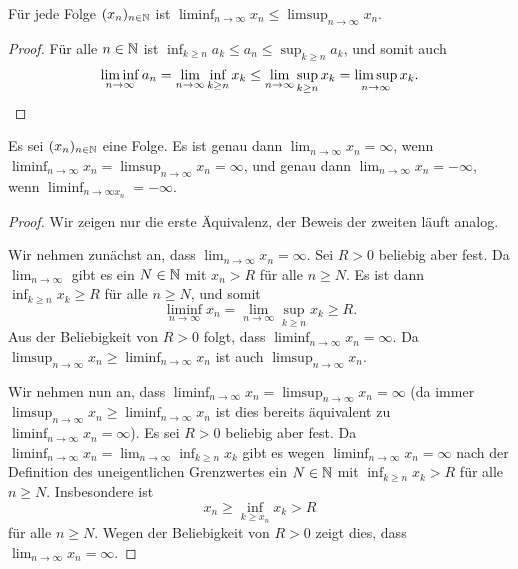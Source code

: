 \documentclass[a4paper,10pt]{article}
\begin{document}
\begin{lem}
 Für jede Folge $(x_n)_{n \in \mathbb{N}}$ ist $\liminf_{n \to \infty} x_n \leq \limsup_{n \to \infty} x_n$.
\end{lem}
\begin{proof}
 Für alle $n \in \mathbb{N}$ ist $\inf_{k \geq n} a_k \leq a_n \leq \sup_{k \geq n} a_k$, und somit auch
 \[
  \liminf_{n \to \infty} a_n
  = \lim_{n \to \infty} \inf_{k \geq n} x_k
  \leq \lim_{n \to \infty} \sup_{k \geq n} x_k
  = \limsup_{n \to \infty} x_k.
  \qedhere
 \]
\end{proof}


\begin{lem}
 Es sei $(x_n)_{n \in \mathbb{N}}$ eine Folge. Es ist genau dann $\lim_{n \to \infty} x_n = \infty$, wenn $\liminf_{n \to \infty} x_n = \limsup_{n \to \infty} x_n = \infty$, und genau dann $\lim_{n \to \infty} x_n = -\infty$, wenn $\liminf_{n \to \infty x_n} = -\infty$.
\end{lem}
\begin{proof}
 Wir zeigen nur die erste Äquivalenz, der Beweis der zweiten läuft analog.
 
 Wir nehmen zunächst an, dass $\lim_{n \to \infty} x_n = \infty$. Sei $R > 0$ beliebig aber fest. Da $\lim_{n \to \infty}$ gibt es ein $N \in \mathbb{N}$ mit $x_n > R$ für alle $n \geq N$. Es ist dann $\inf_{k \geq n} x_k \geq R$ für alle $n \geq N$, und somit
 \[
  \liminf_{n \to \infty} x_n = \lim_{n \to \infty} \sup_{k \geq n} x_k \geq R.
 \]
 Aus der Beliebigkeit von $R > 0$ folgt, dass $\liminf_{n \to \infty} x_n = \infty$. Da $\limsup_{n \to \infty} x_n \geq \liminf_{n \to \infty} x_n$ ist auch $\limsup_{n \to \infty} x_n$.
 
 Wir nehmen nun an, dass $\liminf_{n \to \infty} x_n = \limsup_{n \to \infty} x_n = \infty$ (da immer $\limsup_{n \to \infty} x_n \geq \liminf_{n \to \infty} x_n$ ist dies bereits äquivalent zu $\liminf_{n \to \infty} x_n = \infty$). Es sei $R > 0$ beliebig aber fest. Da $\liminf_{n \to \infty} x_n = \lim_{n \to \infty} \inf_{k \geq n} x_k$ gibt es wegen $\liminf_{n \to \infty} x_n = \infty$ nach der Definition des uneigentlichen Grenzwertes ein $N \in \mathbb{N}$ mit $\inf_{k \geq n} x_k > R$ für alle $n \geq N$. Insbesondere ist
 \[
  x_n \geq \inf_{k \geq x_n} x_k > R
 \]
 für alle $n \geq N$. Wegen der Beliebigkeit von $R > 0$ zeigt dies, dass \mbox{$\lim_{n \to \infty} x_n = \infty$}.
\end{proof}
\end{document}
